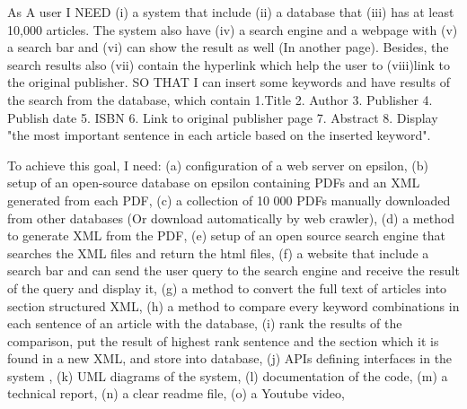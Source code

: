 \documentclass[a4paper,twocolumn,twoside]{article}
\begin{document}
	
	As A user I NEED (i) a system that include (ii) a database that (iii) has at least 10,000 articles.
	The system also have (iv) a search engine and a webpage with (v) a search bar and (vi) can show the result as well (In another page).
	Besides, the search results also (vii) contain the hyperlink which help the user to (viii)link to the original publisher.
	SO THAT I can insert some keywords and have results of the search from the database, which contain 1.Title 2. Author 3. Publisher 4. Publish date 5. ISBN 6. Link to original publisher page 7. Abstract 8. Display "the most important sentence in each article based on the inserted keyword".
	
	To achieve this goal, I need:
	(a) configuration of a web server on epsilon,
	(b) setup of an open-source database on epsilon containing PDFs and an XML generated from each PDF,
	(c) a collection of 10 000 PDFs manually downloaded from other databases (Or download automatically by web crawler),
	(d) a method to generate XML from the PDF,
	(e) setup of an open source search engine that searches the XML files and return the html files,
	(f) a website that include a search bar and can send the user query to the search engine and receive the result of the query and display it,
	(g) a method to convert the full text of articles into section structured XML,
	(h) a method to compare every keyword combinations in each sentence of an article with the database,
	(i) rank the results of the comparison, put the result of highest rank sentence and the section which it is found in a new XML, and store into database,
	(j) APIs defining interfaces in the system , 
	(k) UML diagrams of the system,
	(l) documentation of the code, 
	(m) a technical report,
	(n) a clear readme file,
	(o) a Youtube video,
		
\end{document}
